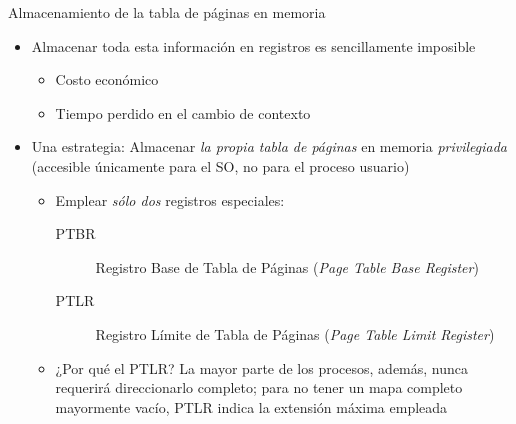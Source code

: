 \documentclass[presentation]{beamer}
\newcommand{\rarrow}{$\rightarrow$\hskip 0.5em}
\begin{document}
\begin{frame}[label={sec:org2606fdc}]{Almacenamiento de la tabla de páginas en memoria}
\begin{itemize}
\item Almacenar toda esta información en registros es sencillamente
imposible
\begin{itemize}
\item Costo económico
\item Tiempo perdido en el cambio de contexto
\end{itemize}
\item Una estrategia: Almacenar \emph{la propia tabla de páginas} en memoria
\emph{privilegiada} (accesible únicamente para el SO, no para el proceso
usuario)
\begin{itemize}
\item Emplear \emph{sólo dos} registros especiales:
\begin{description}
\item[{PTBR}] Registro Base de Tabla de Páginas (\emph{Page Table Base
Register})
\item[{PTLR}] Registro Límite de Tabla de Páginas (\emph{Page Table Limit
Register})
\end{description}
\item ¿Por qué el PTLR? La mayor parte de los procesos, además, nunca
requerirá direccionarlo completo; para no tener un mapa completo
mayormente vacío, PTLR indica la extensión máxima empleada
\end{itemize}
\end{itemize}
\end{frame}

\end{document}
